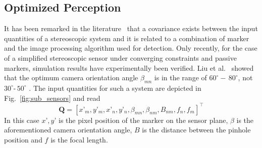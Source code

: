 \documentclass[5p,times,procedia]{elsarticle}
\begin{document}
\subsection{Optimized Perception}\label{subsec:OptPerception}
It has been remarked in the literature~\cite{Di_Leo_2011} that a covariance exists between the input quantities of a stereoscopic system and it is related to a combination of marker and the image processing algorithm used for detection.
Only recently, for the case of a simplified stereoscopic sensor under converging constraints and passive markers, simulation results have experimentally been verified.
Liu et al.~\cite{Liu_2021} showed that the optimum camera orientation angle $\beta_{mn}$ is in the range of $60^{\circ} -\, 80^{\circ}$, not $30^{\circ} \text{-}\, 50^{\circ}$ \cite{Yang2018,Fooladgar2013,Sankowski2017}. The input quantities for such a system are depicted in Fig.~\ref{fig:sub_sensors} and read
\begin{equation*}
	\mathbf{Q}= \left[x’_m, y’_m, x’_n, y’_n, \beta_{mn}, \beta_{nm}, B_{nm}, f_{n},f_{m}\right]^{\top}
\end{equation*}
In this case $x’, y’$ is the pixel position of the marker on the sensor plane, $\beta$ is the aforementioned camera orientation angle, $B$ is the distance between the pinhole position and $f$ is the focal length. 
\end{document}
